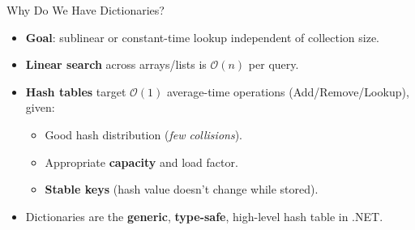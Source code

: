 \documentclass[aspectratio=169]{beamer}
\newcommand{\bigO}[1]{$\mathcal{O}(#1)$}
\begin{document}
\begin{frame}{Why Do We Have Dictionaries?}
  \begin{itemize}
    \item \textbf{Goal}: sublinear or constant-time lookup independent of collection size.
    \item \textbf{Linear search} across arrays/lists is \bigO{n} per query.
    \item \textbf{Hash tables} target \bigO{1} average-time operations (Add/Remove/Lookup), given:
      \begin{itemize}
        \item Good hash distribution (\emph{few collisions}).
        \item Appropriate \textbf{capacity} and load factor.
        \item \textbf{Stable keys} (hash value doesn’t change while stored).
      \end{itemize}
    \item Dictionaries are the \textbf{generic}, \textbf{type-safe}, high-level hash table in .NET.
  \end{itemize}
\end{frame}
\end{document}
